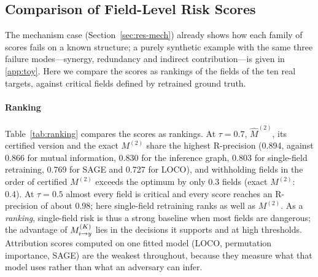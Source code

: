 \subsection{Comparison of Field-Level Risk Scores}\label{sec:res-def}

The mechanism case (Section~\ref{sec:res-mech}) already shows how each family of scores fails on a
known structure; a purely synthetic example with the same three failure modes---synergy, redundancy
and indirect contribution---is given in \ref{app:toy}. Here we compare the scores as rankings of the
fields of the ten real targets, against critical fields defined by retrained ground truth.

\paragraph{Ranking}
Table~\ref{tab:ranking} compares the scores as rankings. At $\tau=0.7$, $\hat M^{(2)}$, its certified
version and the exact $M^{(2)}$ share the highest R-precision (0.894, against 0.866 for mutual information, 0.830 for the
inference graph, 0.803 for single-field retraining, 0.769 for SAGE and 0.727 for LOCO), and withholding fields in
the order of certified $M^{(2)}$ exceeds the optimum by only 0.3 fields (exact $M^{(2)}$: 0.4). At $\tau=0.5$
almost every field is critical and every score reaches an R-precision of about 0.98; here
single-field retraining ranks as well as $M^{(2)}$. As a \emph{ranking}, single-field risk is thus a strong
baseline when most fields are dangerous; the advantage of $M^{(K)}_{i\to y}$ lies in the decisions it supports and at high
thresholds. Attribution scores computed on one fitted
model (LOCO, permutation importance, SAGE) are the weakest throughout, because they measure what
that model uses rather than what an adversary can infer.


